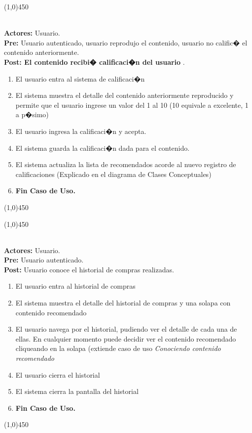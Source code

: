 \documentclass[11pt, a4paper, spanish]{article}
\begin{document}
\begin{center} \line(1,0){450} \end{center}

 \\
\textbf{Actores:} Usuario. \\
\textbf{Pre:} Usuario autenticado, usuario reprodujo el contenido, usuario no calific� el contenido anteriormente. \\
\textbf{Post: El contenido recibi� calificaci�n del usuario} .\\
\begin{enumerate}

	\item El usuario entra al sistema de calificaci�n
	\item El sistema muestra el detalle del contenido anteriormente reproducido y permite que el usuario ingrese un valor del 1 al 10 (10 equivale a excelente, 1 a p�simo)
	\item El usuario ingresa la calificaci�n y acepta.
	\item El sistema guarda la calificaci�n dada para el contenido.
	\item El sistema actualiza la lista de recomendados acorde al nuevo registro de calificaciones (Explicado en el diagrama de Clases Conceptuales)

	\item \textbf{Fin Caso de Uso.}
\end{enumerate}
\begin{center} \line(1,0){450} \end{center}
\newpage
\begin{center} \line(1,0){450} \end{center}


 \\
\textbf{Actores:} Usuario. \\
\textbf{Pre:} Usuario autenticado. \\
\textbf{Post:} Usuario conoce el historial de compras realizadas.\\
\begin{enumerate}
	\item El usuario entra al historial de compras
	\item El sistema muestra el detalle del historial de compras y una solapa con contenido recomendado
	\item El usuario navega por el historial, pudiendo ver el detalle de cada una de ellas. En cualquier momento puede decidir ver el contenido recomendado 	cliqueando en la solapa (extiende caso de uso \emph{Conociendo contenido recomendado}
	\item El usuario cierra el historial
	\item El sistema cierra la pantalla del historial
	\item \textbf{Fin Caso de Uso.}
\end{enumerate}
\begin{center} \line(1,0){450} \end{center}
\end{document}
